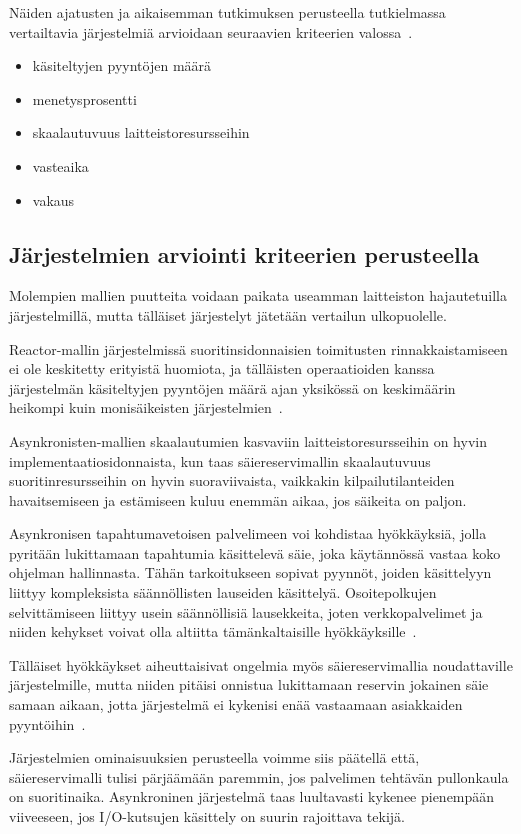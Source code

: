 \documentclass[12pt]{article}
\begin{document}
Näiden ajatusten ja aikaisemman tutkimuksen perusteella
tutkielmassa vertailtavia järjestelmiä arvioidaan seuraavien
kriteerien valossa~\cite{gokhale_performance_2006}.
\begin{itemize}
    \item käsiteltyjen pyyntöjen määrä
    \item menetysprosentti
    \item skaalautuvuus laitteistoresursseihin
    \item vasteaika
    \item vakaus
\end{itemize}
\subsection{Järjestelmien arviointi kriteerien perusteella}
Molempien mallien puutteita voidaan paikata useamman laitteiston hajautetuilla
järjestelmillä, mutta tälläiset järjestelyt jätetään vertailun ulkopuolelle.

Reactor-mallin järjestelmissä suoritinsidonnaisien
toimitusten rinnakkaistamiseen ei ole keskitetty erityistä huomiota, ja tälläisten operaatioiden
kanssa järjestelmän käsiteltyjen pyyntöjen määrä ajan yksikössä on keskimäärin heikompi
kuin monisäikeisten järjestelmien~\cite{davis_case_2017}.

Asynkronisten-mallien skaalautumien kasvaviin laitteistoresursseihin on hyvin
implementaatiosidonnaista, kun taas
säiereservimallin skaalautuvuus suoritinresursseihin on hyvin suoraviivaista,
vaikkakin kilpailutilanteiden havaitsemiseen ja estämiseen kuluu enemmän aikaa,
jos säikeita on paljon.

Asynkronisen tapahtumavetoisen palvelimeen voi kohdistaa hyökkäyksiä, jolla pyritään
lukittamaan tapahtumia käsittelevä säie, joka käytännössä vastaa koko ohjelman hallinnasta.
Tähän tarkoitukseen sopivat pyynnöt,
joiden käsittelyyn liittyy kompleksista säännöllisten lauseiden käsittelyä.
Osoitepolkujen selvittämiseen liittyy usein säännöllisiä lausekkeita,
joten verkkopalvelimet ja niiden
kehykset voivat olla altiitta tämänkaltaisille hyökkäyksille~\cite{davis_case_2017}.

Tälläiset hyökkäykset aiheuttaisivat ongelmia myös säiereservimallia
noudattaville järjestelmille, mutta niiden pitäisi onnistua
lukittamaan reservin jokainen säie samaan aikaan, jotta
järjestelmä ei kykenisi enää vastaamaan asiakkaiden pyyntöihin~\cite{davis_case_2017}.

Järjestelmien ominaisuuksien perusteella voimme siis päätellä että,
säiereservimalli
tulisi pärjäämään paremmin, jos palvelimen tehtävän pullonkaula on suoritinaika.
Asynkroninen järjestelmä
taas luultavasti kykenee pienempään viiveeseen, jos I/O-kutsujen käsittely on suurin rajoittava tekijä.
\end{document}
